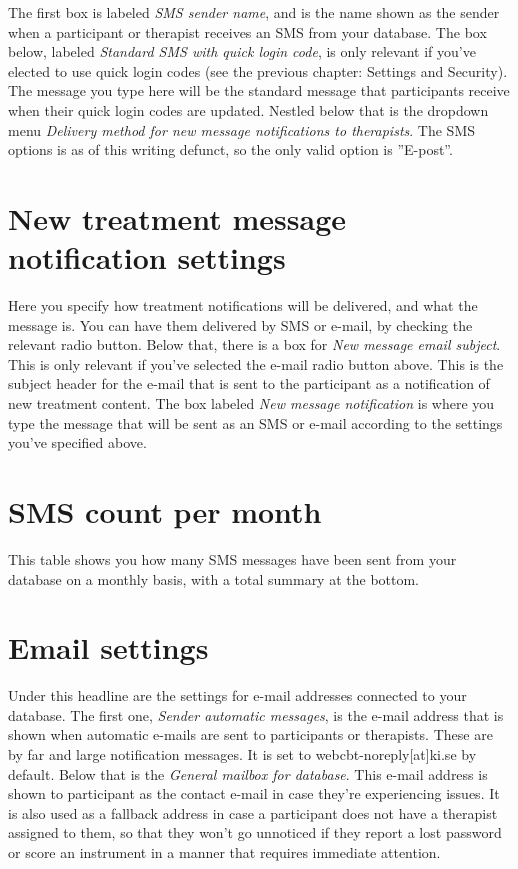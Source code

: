 \documentclass[]{book}
\begin{document}
The first box is labeled \emph{SMS sender name}, and is the name shown as the sender when a participant or therapist receives an SMS from your database.
The box below, labeled \emph{Standard SMS with quick login code}, is only relevant if you've elected to use quick login codes (see the previous chapter: Settings and Security). The message you type here will be the standard message that participants receive when their quick login codes are updated.
Nestled below that is the dropdown menu \emph{Delivery method for new message notifications to therapists}. The SMS options is as of this writing defunct, so the only valid option is ''E-post''.

\hypertarget{new-treatment-message-notification-settings}{%
\section{New treatment message notification settings}\label{new-treatment-message-notification-settings}}

Here you specify how treatment notifications will be delivered, and what the message is. You can have them delivered by SMS or e-mail, by checking the relevant radio button.
Below that, there is a box for \emph{New message email subject}. This is only relevant if you've selected the e-mail radio button above. This is the subject header for the e-mail that is sent to the participant as a notification of new treatment content.
The box labeled \emph{New message notification} is where you type the message that will be sent as an SMS or e-mail according to the settings you've specified above.

\hypertarget{sms-count-per-month}{%
\section{SMS count per month}\label{sms-count-per-month}}

This table shows you how many SMS messages have been sent from your database on a monthly basis, with a total summary at the bottom.

\hypertarget{email-settings}{%
\section{Email settings}\label{email-settings}}

Under this headline are the settings for e-mail addresses connected to your database. The first one, \emph{Sender automatic messages}, is the e-mail address that is shown when automatic e-mails are sent to participants or therapists. These are by far and large notification messages. It is set to webcbt-noreply{[}at{]}ki.se by default.
Below that is the \emph{General mailbox for database}. This e-mail address is shown to participant as the contact e-mail in case they're experiencing issues. It is also used as a fallback address in case a participant does not have a therapist assigned to them, so that they won't go unnoticed if they report a lost password or score an instrument in a manner that requires immediate attention.
\end{document}
